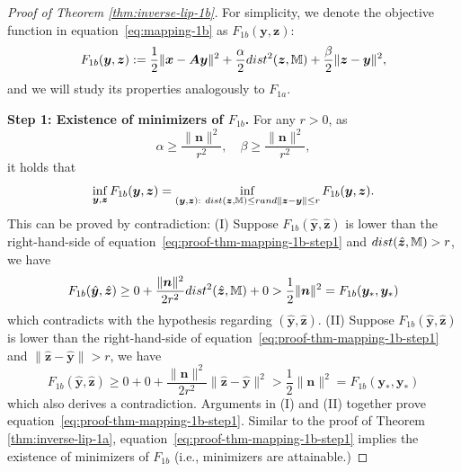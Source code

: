 \documentclass[10pt,a4paper]{amsart}
\def\eqref#1{equation~\ref{#1}}
\def\mA{{\bm{A}}}
\def\sM{{\mathbb{M}}}
\def\vn{{\bm{n}}}
\def\vx{{\bm{x}}}
\def\vy{{\bm{y}}}
\def\vz{{\bm{z}}}
\begin{document}
\begin{proof}[Proof of Theorem \ref{thm:inverse-lip-1b}] 
For simplicity, we denote the objective function in \eqref{eq:mapping-1b} as $F_{1b}(\vy,\vz)$:
\[ 
F_{1b}(\vy,\vz) := \frac{1}{2}\|\vx - \mA \vy\|^2 + \frac{\alpha}{2} \textup{dist}^2(\vz,\sM) + \frac{\beta}{2} \|\vz-\vy\|^2,
\]
and we will study its properties analogously to $F_{1a}$.

\textbf{Step 1: Existence of minimizers of $F_{1b}$.} For any $r>0$, as 
\[ \alpha \geq \frac{\|\vn\|^2}{r^2}, \quad \beta \geq \frac{\|\vn\|^2}{r^2}, \]
it holds that
\begin{equation}
\label{eq:proof-thm-mapping-1b-step1}
\inf_{\vy,\vz}F_{1b}(\vy,\vz) = \inf_{ (\vy,\vz): ~ \textup{dist}(\vz,\sM)\leq r \textup{ and } \|\vz-\vy\|\leq r }F_{1b}(\vy,\vz).
\end{equation}
This can be proved by contradiction: (I) Suppose $F_{1b}(\hat{\vy},\hat{\vz})$ is lower than the right-hand-side of \eqref{eq:proof-thm-mapping-1b-step1} and $\textup{dist}(\hat\vz,\sM) > r$, we have
\[ F_{1b}(\hat{\vy},\hat{\vz}) \geq 0 + \frac{\|\vn\|^2}{2 r^2} \textup{dist}^2(\hat{\vz},\sM) + 0 > \frac{1}{2} \|\vn\|^2 = F_{1b}(\vy_\ast,\vy_\ast)\]
which contradicts with the hypothesis regarding $(\hat{\vy},\hat{\vz})$. (II)  Suppose $F_{1b}(\hat{\vy},\hat{\vz})$ is lower than the right-hand-side of \eqref{eq:proof-thm-mapping-1b-step1} and $\|\hat{\vz}-\hat{\vy}\| > r$, we have
\[ F_{1b}(\hat{\vy},\hat{\vz}) \geq 0 + 0 + \frac{\|\vn\|^2}{2 r^2}\|\hat{\vz}-\hat{\vy}\|^2  > \frac{1}{2}\|\vn\|^2 = F_{1b}(\vy_\ast,\vy_\ast)\]
which also derives a contradiction. Arguments in (I) and (II) together prove \eqref{eq:proof-thm-mapping-1b-step1}. Similar to the proof of Theorem \ref{thm:inverse-lip-1a}, \eqref{eq:proof-thm-mapping-1b-step1} implies the existence of minimizers of $F_{1b}$ (i.e., minimizers are attainable.)


\end{proof}
\end{document}
